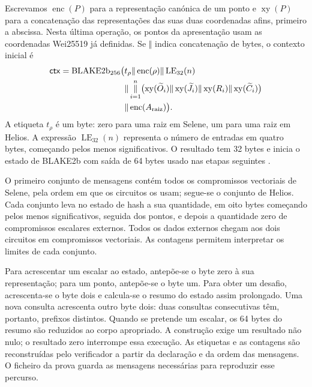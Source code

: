 Escrevamos \(\operatorname{enc}(P)\) para a representação
canónica de um ponto e \(\operatorname{xy}(P)\) para a
concatenação das representações das suas duas coordenadas
afins, primeiro a abscissa. Nesta última operação, os pontos
da apresentação usam as coordenadas Wei25519 já definidas.
Se \(\Vert\) indica concatenação de bytes, o contexto inicial é
\begin{equation}
 \begin{aligned}
 \mathsf{ctx}=\operatorname{BLAKE2b}_{256}\bigl(&
 t_\rho\Vert\operatorname{enc}(\rho)\Vert
            \operatorname{LE}_{32}(n)\\
 &\Vert\mathop{\Vert}_{i=1}^{n}
   \bigl(\operatorname{xy}(\widetilde O_i)
    \Vert\operatorname{xy}(\widetilde J_i)
    \Vert\operatorname{xy}(R_i)
    \Vert\operatorname{xy}(\widetilde C_i)\bigr)\\
 &\Vert\operatorname{enc}(A_{\rm raiz})\bigr).
 \end{aligned}
 \label{eq:fcmp-membership-context}
\end{equation}
A etiqueta \(t_\rho\) é um byte: zero para uma raiz em
Selene, um para uma raiz em Helios. A expressão
\(\operatorname{LE}_{32}(n)\) representa o número de
entradas em quatro bytes, começando pelos menos significativos.
O resultado tem 32 bytes e inicia o estado de BLAKE2b com
saída de 64 bytes usado nas etapas seguintes
\cite{monero-oxide-fcmp-source}.

O primeiro conjunto de mensagens contém todos os compromissos
vectoriais de Selene, pela ordem em que os circuitos os usam;
segue-se o conjunto de Helios. Cada conjunto leva no estado
de hash a sua quantidade, em oito bytes começando pelos menos
significativos, seguida dos pontos,
e depois a quantidade zero de compromissos escalares externos.
Todos os dados externos chegam aos dois circuitos em compromissos vectoriais.
As contagens permitem interpretar os limites de cada conjunto.

Para acrescentar um escalar ao estado, antepõe-se o byte zero
à sua representação; para um ponto, antepõe-se o byte um.
Para obter um desafio, acrescenta-se o byte dois e calcula-se
o resumo do estado assim prolongado. Uma nova consulta acrescenta
outro byte dois: duas consultas consecutivas têm, portanto,
prefixos distintos. Quando se pretende um escalar, os 64 bytes
do resumo são reduzidos ao corpo apropriado. A construção
exige um resultado não nulo; o resultado zero interrompe
essa execução. As etiquetas e as contagens são reconstruídas
pelo verificador a partir da declaração e da ordem das mensagens.
O ficheiro da prova guarda as mensagens necessárias para
reproduzir esse percurso.


